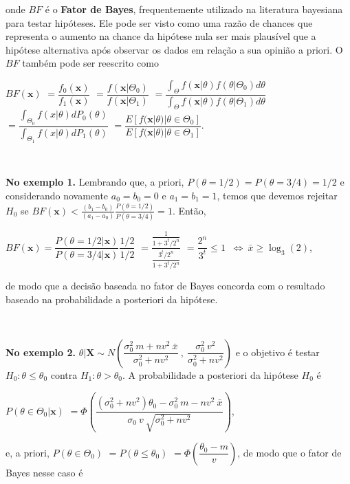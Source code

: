 \documentclass[
]{book}
\begin{document}
onde \(BF\) é o \textbf{Fator de Bayes}, frequentemente utilizado na literatura bayesiana para testar hipóteses. Ele pode ser visto como uma razão de chances que representa o aumento na chance da hipótese nula ser mais plausível que a hipótese alternativa após observar os dados em relação a sua opinião a priori. O \(BF\) também pode ser reescrito como

\(BF(\boldsymbol x)\)
\(=\dfrac{f_0(\boldsymbol x)}{f_1(\boldsymbol x)}\)
\(=\dfrac{f(\boldsymbol x | \Theta_0)}{f(\boldsymbol x | \Theta_1)}\)
\(=\dfrac{\displaystyle \int_{\Theta}f(\boldsymbol x|\theta) f(\theta|\Theta_0) d\theta} {\displaystyle \int_{\Theta} f(\boldsymbol x|\theta)f(\theta|\Theta_1)d\theta}\)
\(=\dfrac{\displaystyle \int_{\Theta_0}f(x|\theta)dP_0(\theta)}{\displaystyle \int_{\Theta_1}f(x|\theta)dP_1(\theta)}\)
\(=\dfrac{E\left[f(\boldsymbol x|\theta)|\theta\in\Theta_0\right]}{E\left[f(\boldsymbol x|\theta)|\theta \in \Theta_1\right]}\).

\(~\)

\textbf{No exemplo 1.} Lembrando que, a priori, \(P(\theta=1/2)=P(\theta=3/4)=1/2\) e considerando novamente \(a_0=b_0=0\) e \(a_1=b_1=1\), temos que devemos rejeitar \(H_0\) se \(BF(\boldsymbol x)<\frac{(b_1-b_0)}{(a_1-a_0)}\frac{P(\theta=1/2)}{P(\theta=3/4)}=1\). Então,

\(BF(\boldsymbol x)=\dfrac{P(\theta=1/2|\boldsymbol x)}{P(\theta=3/4|\boldsymbol x)}\dfrac{1/2}{1/2}\) \(=\dfrac{\frac{1}{1+3^t/2^n}}{\frac{3^t/2^n}{1+3^t/2^n}}\) \(=\dfrac{2^n}{3^t}\leq 1\) \(~\Longleftrightarrow~ \bar{x} \geq \log_3(2)\),

de modo que a decisão baseada no fator de Bayes concorda com o resultado baseado na probabilidade a posteriori da hipótese.

\(~\)

\textbf{No exemplo 2.} \(\theta|\boldsymbol X \sim N\left(\dfrac{{\sigma}_0^2~m+nv^2~\bar x}{{\sigma}_0^2+nv^2}~,~\dfrac{{\sigma}_0^2~v^2}{{\sigma}_0^2+nv^2}\right)\) e o objetivo é testar \(H_0: \theta\leq \theta_0\) contra \(H_1:\theta > \theta_0\). A probabilidade a posteriori da hipótese \(H_0\) é

\(P\left(\theta\in\Theta_0|\boldsymbol x\right)\)
\(= \Phi\left(\dfrac{({\sigma}_0^2+nv^2)\theta_0-{\sigma}_0^2~m-nv^2~\bar x}{{\sigma}_0~v~\sqrt{{\sigma}_ 0^2+nv^2}}\right)\),

e, a priori, \(P(\theta \in \Theta_0)\) \(=P(\theta \leq \theta_0)\) \(= \Phi\left(\dfrac{\theta_0-m}{v}\right)\), de modo que o fator de Bayes nesse caso é
\end{document}
